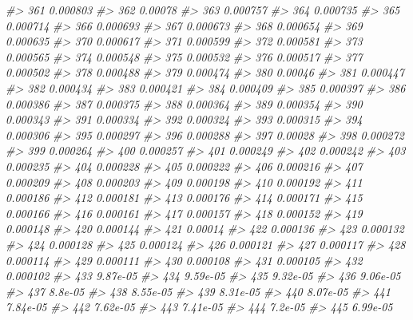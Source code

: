\documentclass[]{book}
\newenvironment{Shaded}{\begin{snugshade}}{\end{snugshade}}
\newcommand{\CommentTok}[1]{\textcolor[rgb]{0.56,0.35,0.01}{\textit{#1}}}
\begin{document}
\begin{Shaded}
\begin{Highlighting}[]
\CommentTok{#> 361  0.000803 }
\CommentTok{#> 362  0.00078 }
\CommentTok{#> 363  0.000757 }
\CommentTok{#> 364  0.000735 }
\CommentTok{#> 365  0.000714 }
\CommentTok{#> 366  0.000693 }
\CommentTok{#> 367  0.000673 }
\CommentTok{#> 368  0.000654 }
\CommentTok{#> 369  0.000635 }
\CommentTok{#> 370  0.000617 }
\CommentTok{#> 371  0.000599 }
\CommentTok{#> 372  0.000581 }
\CommentTok{#> 373  0.000565 }
\CommentTok{#> 374  0.000548 }
\CommentTok{#> 375  0.000532 }
\CommentTok{#> 376  0.000517 }
\CommentTok{#> 377  0.000502 }
\CommentTok{#> 378  0.000488 }
\CommentTok{#> 379  0.000474 }
\CommentTok{#> 380  0.00046 }
\CommentTok{#> 381  0.000447 }
\CommentTok{#> 382  0.000434 }
\CommentTok{#> 383  0.000421 }
\CommentTok{#> 384  0.000409 }
\CommentTok{#> 385  0.000397 }
\CommentTok{#> 386  0.000386 }
\CommentTok{#> 387  0.000375 }
\CommentTok{#> 388  0.000364 }
\CommentTok{#> 389  0.000354 }
\CommentTok{#> 390  0.000343 }
\CommentTok{#> 391  0.000334 }
\CommentTok{#> 392  0.000324 }
\CommentTok{#> 393  0.000315 }
\CommentTok{#> 394  0.000306 }
\CommentTok{#> 395  0.000297 }
\CommentTok{#> 396  0.000288 }
\CommentTok{#> 397  0.00028 }
\CommentTok{#> 398  0.000272 }
\CommentTok{#> 399  0.000264 }
\CommentTok{#> 400  0.000257 }
\CommentTok{#> 401  0.000249 }
\CommentTok{#> 402  0.000242 }
\CommentTok{#> 403  0.000235 }
\CommentTok{#> 404  0.000228 }
\CommentTok{#> 405  0.000222 }
\CommentTok{#> 406  0.000216 }
\CommentTok{#> 407  0.000209 }
\CommentTok{#> 408  0.000203 }
\CommentTok{#> 409  0.000198 }
\CommentTok{#> 410  0.000192 }
\CommentTok{#> 411  0.000186 }
\CommentTok{#> 412  0.000181 }
\CommentTok{#> 413  0.000176 }
\CommentTok{#> 414  0.000171 }
\CommentTok{#> 415  0.000166 }
\CommentTok{#> 416  0.000161 }
\CommentTok{#> 417  0.000157 }
\CommentTok{#> 418  0.000152 }
\CommentTok{#> 419  0.000148 }
\CommentTok{#> 420  0.000144 }
\CommentTok{#> 421  0.00014 }
\CommentTok{#> 422  0.000136 }
\CommentTok{#> 423  0.000132 }
\CommentTok{#> 424  0.000128 }
\CommentTok{#> 425  0.000124 }
\CommentTok{#> 426  0.000121 }
\CommentTok{#> 427  0.000117 }
\CommentTok{#> 428  0.000114 }
\CommentTok{#> 429  0.000111 }
\CommentTok{#> 430  0.000108 }
\CommentTok{#> 431  0.000105 }
\CommentTok{#> 432  0.000102 }
\CommentTok{#> 433  9.87e-05 }
\CommentTok{#> 434  9.59e-05 }
\CommentTok{#> 435  9.32e-05 }
\CommentTok{#> 436  9.06e-05 }
\CommentTok{#> 437  8.8e-05 }
\CommentTok{#> 438  8.55e-05 }
\CommentTok{#> 439  8.31e-05 }
\CommentTok{#> 440  8.07e-05 }
\CommentTok{#> 441  7.84e-05 }
\CommentTok{#> 442  7.62e-05 }
\CommentTok{#> 443  7.41e-05 }
\CommentTok{#> 444  7.2e-05 }
\CommentTok{#> 445  6.99e-05 }

\end{Highlighting}
\end{Shaded}
\end{document}
